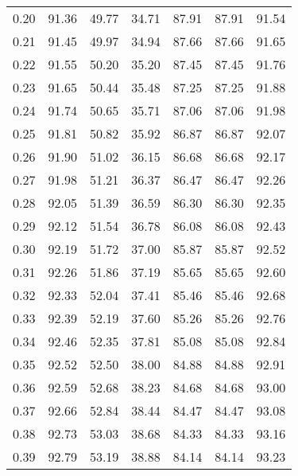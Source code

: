 \begin{tabular}{|c|c|c|c|c|c|c|}
      0.20 &     91.36 &     49.77 &      34.71 &   87.91 &      87.91 &         91.54 \\
      0.21 &     91.45 &     49.97 &      34.94 &   87.66 &      87.66 &         91.65 \\
      0.22 &     91.55 &     50.20 &      35.20 &   87.45 &      87.45 &         91.76 \\
      0.23 &     91.65 &     50.44 &      35.48 &   87.25 &      87.25 &         91.88 \\
      0.24 &     91.74 &     50.65 &      35.71 &   87.06 &      87.06 &         91.98 \\
      0.25 &     91.81 &     50.82 &      35.92 &   86.87 &      86.87 &         92.07 \\
      0.26 &     91.90 &     51.02 &      36.15 &   86.68 &      86.68 &         92.17 \\
      0.27 &     91.98 &     51.21 &      36.37 &   86.47 &      86.47 &         92.26 \\
      0.28 &     92.05 &     51.39 &      36.59 &   86.30 &      86.30 &         92.35 \\
      0.29 &     92.12 &     51.54 &      36.78 &   86.08 &      86.08 &         92.43 \\
      0.30 &     92.19 &     51.72 &      37.00 &   85.87 &      85.87 &         92.52 \\
      0.31 &     92.26 &     51.86 &      37.19 &   85.65 &      85.65 &         92.60 \\
      0.32 &     92.33 &     52.04 &      37.41 &   85.46 &      85.46 &         92.68 \\
      0.33 &     92.39 &     52.19 &      37.60 &   85.26 &      85.26 &         92.76 \\
      0.34 &     92.46 &     52.35 &      37.81 &   85.08 &      85.08 &         92.84 \\
      0.35 &     92.52 &     52.50 &      38.00 &   84.88 &      84.88 &         92.91 \\
      0.36 &     92.59 &     52.68 &      38.23 &   84.68 &      84.68 &         93.00 \\
      0.37 &     92.66 &     52.84 &      38.44 &   84.47 &      84.47 &         93.08 \\
      0.38 &     92.73 &     53.03 &      38.68 &   84.33 &      84.33 &         93.16 \\
      0.39 &     92.79 &     53.19 &      38.88 &   84.14 &      84.14 &         93.23 \\

\end{tabular}
